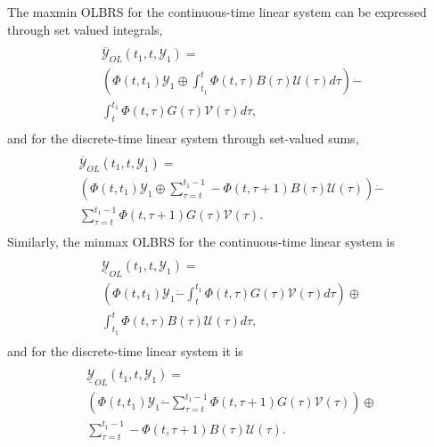 \documentclass[letterpaper,10pt,english]{sphinxmanual}
\begin{document}
The maxmin OLBRS for the continuous-time linear system can be expressed
through set valued integrals,
\label{chap_reach:equation-ctlsmaxminb}\begin{gather}
\begin{split}\begin{array}{l}
\overline{{\mathcal Y}}_{OL}(t_1, t, {\mathcal Y}_1) = \\
\left(\Phi(t, t_1){\mathcal Y}_1 \oplus
\int_{t_1}^t\Phi(t, \tau)B(\tau){\mathcal U}(\tau)d\tau\right) \dot{-} \\
\int_{t}^{t_1}\Phi(t, \tau)G(\tau){\mathcal V}(\tau)d\tau,
\end{array}\end{split}\label{chap_reach-ctlsmaxminb}
\end{gather}
and for the discrete-time linear system through set-valued sums,
\label{chap_reach:equation-dtlsmaxminb}\begin{gather}
\begin{split}\begin{array}{l}
\overline{{\mathcal Y}}_{OL}(t_1, t, {\mathcal Y}_1) = \\
\left(\Phi(t, t_1){\mathcal Y}_1 \oplus
\sum_{\tau=t}^{t_1-1}-\Phi(t, \tau+1)B(\tau){\mathcal U}(\tau)\right) \dot{-} \\
\sum_{\tau=t}^{t_1-1}\Phi(t, \tau+1)G(\tau){\mathcal V}(\tau).
\end{array}\end{split}\label{chap_reach-dtlsmaxminb}
\end{gather}
Similarly, the minmax OLBRS for the continuous-time linear system is
\label{chap_reach:equation-ctlsminmaxb}\begin{gather}
\begin{split}\begin{array}{l}
\underline{{\mathcal Y}}_{OL}(t_1, t, {\mathcal Y}_1) = \\
\left(\Phi(t, t_1){\mathcal Y}_1 \dot{-}
\int_{t}^{t_1}\Phi(t, \tau)G(\tau){\mathcal V}(\tau)d\tau\right)
\oplus \\
\int_{t_1}^{t}\Phi(t, \tau)B(\tau){\mathcal U}(\tau)d\tau,
\end{array}\end{split}\label{chap_reach-ctlsminmaxb}
\end{gather}
and for the discrete-time linear system it is
\label{chap_reach:equation-dtlsminmaxb}\begin{gather}
\begin{split}\begin{array}{l}
\underline{{\mathcal Y}}_{OL}(t_1, t, {\mathcal Y}_1) = \\
\left(\Phi(t, t_1){\mathcal Y}_1 \dot{-}
\sum_{\tau=t}^{t_1-1}\Phi(t, \tau+1)G(\tau){\mathcal V}(\tau)\right)
\oplus \\
\sum_{\tau=t}^{t_1-1}-\Phi(t, \tau+1)B(\tau){\mathcal U}(\tau).
\end{array}\end{split}\label{chap_reach-dtlsminmaxb}
\end{gather}
\end{document}
